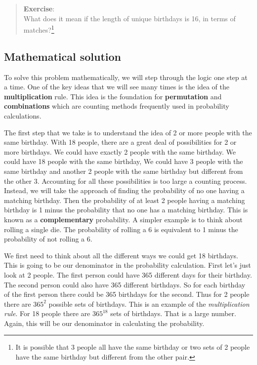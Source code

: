 \documentclass[
  letterpaper,
  DIV=11,
  numbers=noendperiod]{scrreprt}
\begin{document}
\begin{quote}
\textbf{Exercise}:\\
What does it mean if the length of unique birthdays is 16, in terms of
matches?\footnote{It is possible that 3 people all have the same
  birthday or two sets of 2 people have the same birthday but different
  from the other pair.}
\end{quote}

\subsection{Mathematical solution}\label{mathematical-solution}

To solve this problem mathematically, we will step through the logic one
step at a time. One of the key ideas that we will see many times is the
idea of the \textbf{multiplication} rule. This idea is the foundation
for \textbf{permutation} and \textbf{combinations} which are counting
methods frequently used in probability calculations.

The first step that we take is to understand the idea of 2 or more
people with the same birthday. With 18 people, there are a great deal of
possibilities for 2 or more birthdays. We could have exactly 2 people
with the same birthday. We could have 18 people with the same birthday,
We could have 3 people with the same birthday and another 2 people with
the same birthday but different from the other 3. Accounting for all
these possibilities is too large a counting process. Instead, we will
take the approach of finding the probability of no one having a matching
birthday. Then the probability of at least 2 people having a matching
birthday is 1 minus the probability that no one has a matching birthday.
This is known as a \textbf{complementary} probability. A simpler example
is to think about rolling a single die. The probability of rolling a 6
is equivalent to 1 minus the probability of not rolling a 6.

We first need to think about all the different ways we could get 18
birthdays. This is going to be our denominator in the probability
calculation. First let's just look at 2 people. The first person could
have 365 different days for their birthday. The second person could also
have 365 different birthdays. So for each birthday of the first person
there could be 365 birthdays for the second. Thus for 2 people there are
\(365^2\) possible sets of birthdays. This is an example of the
\emph{multiplication rule}. For 18 people there are \(365^{18}\) sets of
birthdays. That is a large number. Again, this will be our denominator
in calculating the probability.
\end{document}
